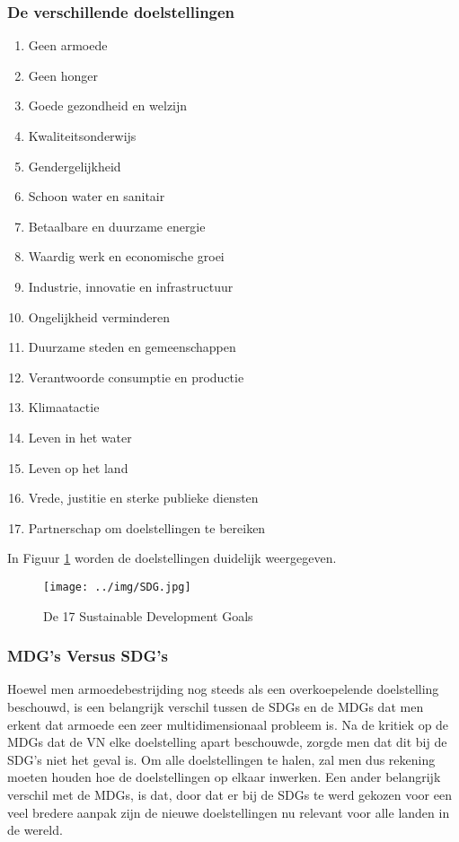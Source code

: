  \subsubsection{De verschillende doelstellingen}
 \begin{enumerate}
 	\item Geen armoede
 		\item Geen honger
 		\item Goede gezondheid en welzijn
 		\item Kwaliteitsonderwijs
 		\item Gendergelijkheid
 		\item Schoon water en sanitair
 		\item Betaalbare en duurzame energie
 		\item Waardig werk en economische groei
 		\item Industrie, innovatie en infrastructuur
 		\item Ongelijkheid verminderen
 		\item Duurzame steden en gemeenschappen
 		\item Verantwoorde consumptie en productie
 		\item Klimaatactie
 		\item Leven in het water
 		\item Leven op het land
 		\item Vrede, justitie en sterke publieke diensten
 		\item Partnerschap om doelstellingen te bereiken
 \end{enumerate}
\autocite{VerenigdeNaties2004}

In Figuur \ref{SDGs} worden de doelstellingen duidelijk weergegeven.
 
 \begin{figure}[h!]
 	\texttt{[image: ../img/SDG.jpg]}
 	\caption{De 17 Sustainable Development Goals \autocite{VerenigdeNaties2004}}
 	\label{SDGs}
 \end{figure}

\subsubsection{MDG's Versus SDG's}
Hoewel men armoedebestrijding nog steeds als een overkoepelende doelstelling beschouwd, is een belangrijk verschil tussen de SDGs en de  MDGs dat men erkent dat armoede een zeer multidimensionaal probleem is. Na de kritiek op de MDGs dat de VN elke doelstelling apart beschouwde, zorgde men dat dit bij de SDG's niet het geval is. Om alle doelstellingen te halen, zal men dus rekening moeten houden hoe de doelstellingen op elkaar inwerken. Een ander belangrijk verschil met de MDGs, is dat, door dat er bij de SDGs te werd gekozen voor een veel bredere aanpak zijn de nieuwe doelstellingen nu relevant voor alle landen in de wereld. \autocite{VN2015}

